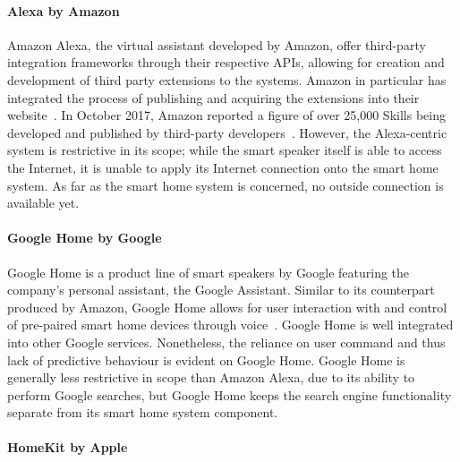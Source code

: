 \documentclass[letterpaper, twocolumn, 10pt, conference]{IEEEtran}
\begin{document}
\paragraph{Alexa by Amazon}

Amazon Alexa, the virtual assistant developed by Amazon, offer third-party integration frameworks through their respective APIs, allowing for creation and development of third party extensions to the systems. Amazon in particular has integrated the process of publishing and acquiring the extensions into their website~\cite{amazon2018understand}. In October 2017, Amazon reported a figure of over 25,000 Skills being developed and published by third-party developers~\cite{businesswire2017amazonQ3}. However, the Alexa-centric system is restrictive in its scope; while the smart speaker itself is able to access the Internet, it is unable to apply its Internet connection onto the smart home system. As far as the smart home system is concerned, no outside connection is available yet.

\paragraph{Google Home by Google}

Google Home is a product line of smart speakers by Google featuring the company's personal assistant, the Google Assistant. Similar to its counterpart produced by Amazon, Google Home allows for user interaction with and control of pre-paired smart home devices through voice~\cite{bohn2016googlehome}. Google Home is well integrated into other Google services. Nonetheless, the reliance on user command and thus lack of predictive behaviour is evident on Google Home. Google Home is generally less restrictive in scope than Amazon Alexa, due to its ability to perform Google searches, but Google Home keeps the search engine functionality separate from its smart home system component.

\paragraph{HomeKit by Apple}
\end{document}
